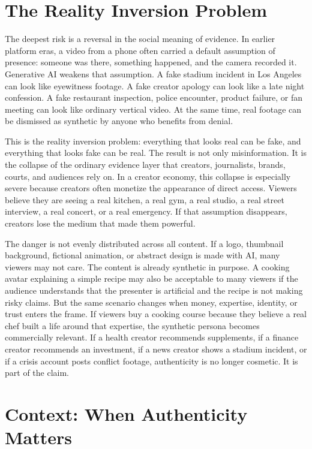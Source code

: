 \documentclass[11pt]{article}
\begin{document}
\section{The Reality Inversion Problem}

The deepest risk is a reversal in the social meaning of evidence. In earlier platform eras, a video from a phone often carried a default assumption of presence: someone was there, something happened, and the camera recorded it. Generative AI weakens that assumption. A fake stadium incident in Los Angeles can look like eyewitness footage. A fake creator apology can look like a late night confession. A fake restaurant inspection, police encounter, product failure, or fan meeting can look like ordinary vertical video. At the same time, real footage can be dismissed as synthetic by anyone who benefits from denial.

This is the reality inversion problem: everything that looks real can be fake, and everything that looks fake can be real. The result is not only misinformation. It is the collapse of the ordinary evidence layer that creators, journalists, brands, courts, and audiences rely on. In a creator economy, this collapse is especially severe because creators often monetize the appearance of direct access. Viewers believe they are seeing a real kitchen, a real gym, a real studio, a real street interview, a real concert, or a real emergency. If that assumption disappears, creators lose the medium that made them powerful.

The danger is not evenly distributed across all content. If a logo, thumbnail background, fictional animation, or abstract design is made with AI, many viewers may not care. The content is already synthetic in purpose. A cooking avatar explaining a simple recipe may also be acceptable to many viewers if the audience understands that the presenter is artificial and the recipe is not making risky claims. But the same scenario changes when money, expertise, identity, or trust enters the frame. If viewers buy a cooking course because they believe a real chef built a life around that expertise, the synthetic persona becomes commercially relevant. If a health creator recommends supplements, if a finance creator recommends an investment, if a news creator shows a stadium incident, or if a crisis account posts conflict footage, authenticity is no longer cosmetic. It is part of the claim.

\section{Context: When Authenticity Matters}
\end{document}
